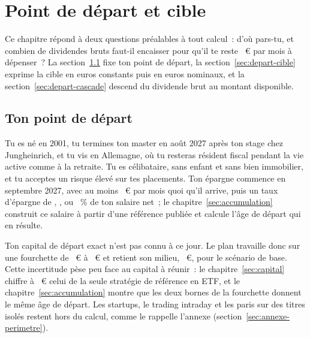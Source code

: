 \section{Point de d\'epart et cible}\label{sec:depart}

Ce chapitre r\'epond \`a deux questions pr\'ealables \`a tout calcul~: d'o\`u pars-tu, et combien de
dividendes bruts faut-il encaisser pour qu'il te reste \ZielMonat~€ par mois \`a d\'epenser~? La
section~\ref{sec:depart-profil} fixe ton point de d\'epart, la section~\ref{sec:depart-cible} exprime
la cible en euros constants puis en euros nominaux, et la section~\ref{sec:depart-cascade} descend du
dividende brut au montant disponible.

\subsection{Ton point de d\'epart}\label{sec:depart-profil}

Tu es n\'e en 2001, tu termines ton master en ao\^ut 2027 apr\`es ton stage chez Jungheinrich, et tu
vis en Allemagne, o\`u tu resteras r\'esident fiscal pendant la vie active comme \`a la retraite. Tu es
c\'elibataire, sans enfant et sans bien immobilier, et tu acceptes un risque \'elev\'e sur tes
placements. Ton \'epargne commence en septembre 2027, avec au moins \EpargneMinimum~€ par mois quoi
qu'il arrive, puis un taux d'\'epargne de \SparquoteZehn{}, \SparquoteZwanzig{}, \SparquoteDreissig{} ou
\SparquoteFuenfzig~\% de ton salaire net~; le chapitre~\ref{sec:accumulation} construit ce salaire \`a partir d'une
r\'ef\'erence publi\'ee et calcule l'\^age de d\'epart qui en r\'esulte.

Ton capital de d\'epart exact n'est pas connu \`a ce jour. Le plan travaille donc sur une fourchette
de \KapitalDepartNiedrig~€ \`a \KapitalDepartHoch~€ et retient son milieu, \KapitalDepartMitte~€, pour
le sc\'enario de base. Cette incertitude p\`ese peu face au capital \`a r\'eunir~: le chapitre~\ref{sec:capital} chiffre
\`a \KapitalEtfReferenz~€ celui de la seule strat\'egie de r\'ef\'erence en ETF, et le chapitre~\ref{sec:accumulation}
montre que les deux bornes de la fourchette donnent le m\^eme \^age de d\'epart. Les
startups, le trading intraday et les paris sur des titres isol\'es restent hors du calcul, comme le
rappelle l'annexe (section~\ref{sec:annexe-perimetre}).

